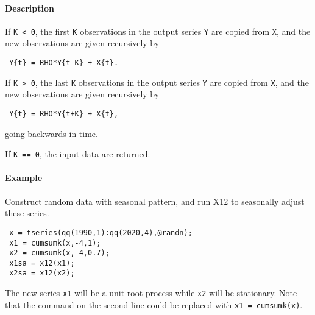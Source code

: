  \paragraph{Description}
 
 If \texttt{K \textless{} 0}, the first \texttt{K} observations in the
 output series \texttt{Y} are copied from \texttt{X}, and the new
 observations are given recursively by
 
 \begin{verbatim}
 Y{t} = RHO*Y{t-K} + X{t}.
 \end{verbatim}
 
 If \texttt{K \textgreater{} 0}, the last \texttt{K} observations in the
 output series \texttt{Y} are copied from \texttt{X}, and the new
 observations are given recursively by
 
 \begin{verbatim}
 Y{t} = RHO*Y{t+K} + X{t},
 \end{verbatim}
 
 going backwards in time.
 
 If \texttt{K == 0}, the input data are returned.
 
 \paragraph{Example}
 
 Construct random data with seasonal pattern, and run X12 to seasonally
 adjust these series.
 
 \begin{verbatim}
 x = tseries(qq(1990,1):qq(2020,4),@randn);
 x1 = cumsumk(x,-4,1);
 x2 = cumsumk(x,-4,0.7);
 x1sa = x12(x1);
 x2sa = x12(x2);
 \end{verbatim}
 
 The new series \texttt{x1} will be a unit-root process while \texttt{x2}
 will be stationary. Note that the command on the second line could be
 replaced with \texttt{x1 = cumsumk(x)}.


